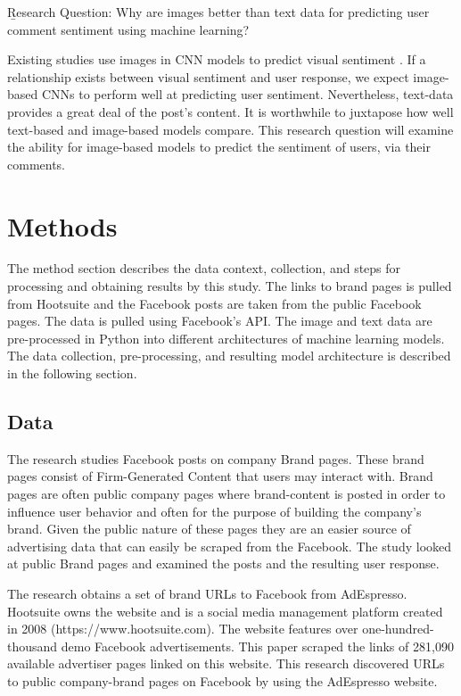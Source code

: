 \documentclass{article}
\begin{document}
\b{Research Question:} Why are images better than text data for predicting user comment sentiment using machine learning?


Existing studies use images in CNN models to predict visual sentiment \cite{Sengalin2017, Xu2014}. If a relationship exists between visual sentiment and user response, we expect image-based CNNs to perform well at predicting user sentiment. Nevertheless, text-data provides a great deal of the post's content. It is worthwhile to juxtapose how well text-based and image-based models compare. This research question will examine the ability for image-based models to predict the sentiment of users, via their comments.

\section{Methods}
The method section describes the data context, collection, and steps for processing and obtaining results by this study. The links to brand pages is pulled from Hootsuite and the Facebook posts are taken from the public Facebook pages. The data is pulled using Facebook's API. The image and text data are pre-processed in Python into different architectures of machine learning models. The data collection, pre-processing, and resulting model architecture is described in the following section.

\subsection{Data}
The research studies Facebook posts on company Brand pages. These brand pages consist of Firm-Generated Content that users may interact with. Brand pages are often public company pages where brand-content is posted in order to influence user behavior and often for the purpose of building the company's brand. Given the public nature of these pages they are an easier source of advertising data that can easily be scraped from the Facebook. The study looked at public Brand pages and examined the posts and the resulting user response.

The research obtains a set of brand URLs to Facebook from AdEspresso. Hootsuite owns the website and is a social media management platform created in 2008 (https://www.hootsuite.com). The website features over one-hundred-thousand demo Facebook advertisements. This paper scraped the links of 281,090 available advertiser pages linked on this website. This research discovered URLs to public company-brand pages on Facebook by using the AdEspresso website.
\end{document}
